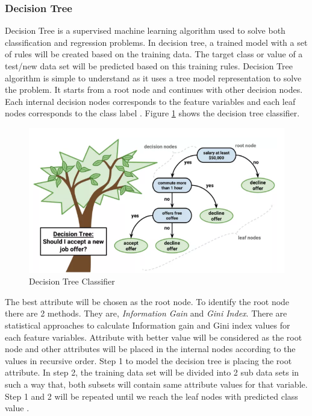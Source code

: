 \documentclass[sigconf]{acmart}
\begin{document}
\subsubsection{Decision Tree}\label{Decision Tree}

Decision Tree is a supervised machine learning algorithm used to solve both classification and regression problems. In decision tree, a trained model with a set of rules will be created based on the training data. The target class or value of a test/new data set will be predicted based on this training rules. Decision Tree algorithm is simple to understand as it uses a tree model representation to solve the problem. It starts from a root node and continues with other decision nodes. Each internal decision nodes corresponds to the feature variables and each leaf nodes corresponds to the class label \cite{decision-tree}. Figure \ref{fig:Figure2} shows the decision tree classifier. 


\begin{figure}[htb]
  \centering
  \includegraphics[width=1.0\columnwidth]{images/Figure2.png}
  \caption{Decision Tree Classifier
  \cite{decision-tree}}
  \label{fig:Figure2} 
\end{figure}

The best attribute will be chosen as the root node. To identify the root node there are 2 methods. They are, \emph{Information Gain} and \emph{Gini Index}. There are statistical approaches to calculate Information gain and Gini index values for each feature variables. Attribute with better value will be considered as the root node and other attributes will be placed in the internal nodes according to the values in recursive order. Step 1 to model the decision tree is placing the root attribute. In step 2, the training data set will be divided into 2 sub data sets in such a way that, both subsets will contain same attribute values for that variable. Step 1 and 2 will be repeated until we reach the leaf nodes with predicted class value \cite{decision-tree}.
\end{document}
